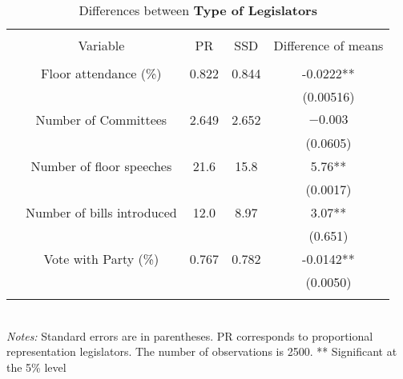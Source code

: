 \documentclass{article}
\begin{document}
\begin{table}[!htbp] \centering 
	\caption{Differences between \textbf{Type of Legislators}}
	\begin{tabular}{@{\extracolsep{4pt}} ccccc} 
		\\[-1.8ex]\hline 
		\hline \\[-1.8ex] 
		& Variable & PR & SSD & Difference of means  \\ 
		\hline \\[-1.8ex] 
		& Floor attendance (\%) &  0.822 &  0.844 &  -0.0222**   \\ 
		& &   &  &  (0.00516) \\ 
		& Number of Committees   & 2.649  &2.652  &  $-0.003$ \\ 
		& &   &  & (0.0605)  \\ 
		& Number of floor speeches   &  21.6 &15.8&  5.76**  \\ 
		& &   &  & (0.0017) \\ 
		& Number of bills introduced  & 12.0  & 8.97 &3.07** \\ 
		& &   &  &  (0.651) \\ 
		& Vote with Party (\%)   & 0.767 & 0.782    &   -0.0142**\\ 
		& &   &  & (0.0050)  \\ 
		\hline \\[-1.8ex] 
	\end{tabular} 
	\\
	\textit{Notes:} Standard errors are in parentheses. PR corresponds to proportional representation legislators. The number of observations is 2500. ** Significant at the 5\% level 
\end{table} 
\end{document}

